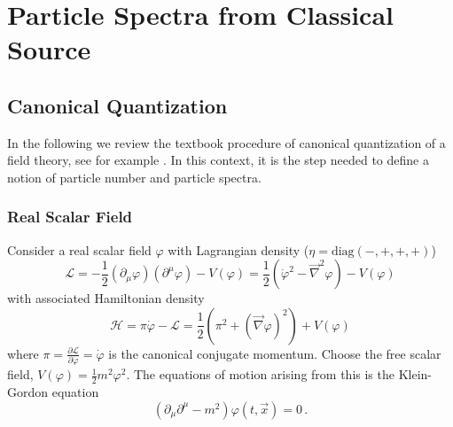 \chapter{Particle Spectra from Classical Source}

\section{Canonical Quantization}

In the following we review the textbook procedure of canonical quantization of a field theory, see for example \cite{PeskinSchroeder_1995}. In this context, it is the step needed to define a notion of particle number and particle spectra.

\subsection{Real Scalar Field}

Consider a real scalar field $\varphi$ with Lagrangian density ($\eta=\text{diag}(-,+,+,+)$)
\begin{equation}
    \mathcal{L}=-\frac{1}{2}(\partial_\mu\varphi)(\partial^\mu\varphi)-V(\varphi)=\frac{1}{2}(\dot{\varphi}^2-\vec{\nabla}^2\varphi)-V(\varphi)
    \label{eq:LagrangianRealScalar}
\end{equation}
with associated Hamiltonian density
\begin{equation}
    \mathcal{H}=\pi\dot{\varphi}-\mathcal{L}=\frac{1}{2}(\pi^2+(\vec{\nabla}\varphi)^2)+V(\varphi)
\end{equation}
where $\pi=\frac{\partial\mathcal{L}}{\partial\dot{\varphi}}=\dot{\varphi}$ is the canonical conjugate momentum. Choose the free scalar field, $V(\varphi)=\frac{1}{2}m^2\varphi^2$. The equations of motion arising from this is the Klein-Gordon equation
\begin{equation}
    (\partial_\mu\partial^\mu-m^2)\varphi(t,\vec{x})=0\,.
    \label{eq:KGEq}
\end{equation}

